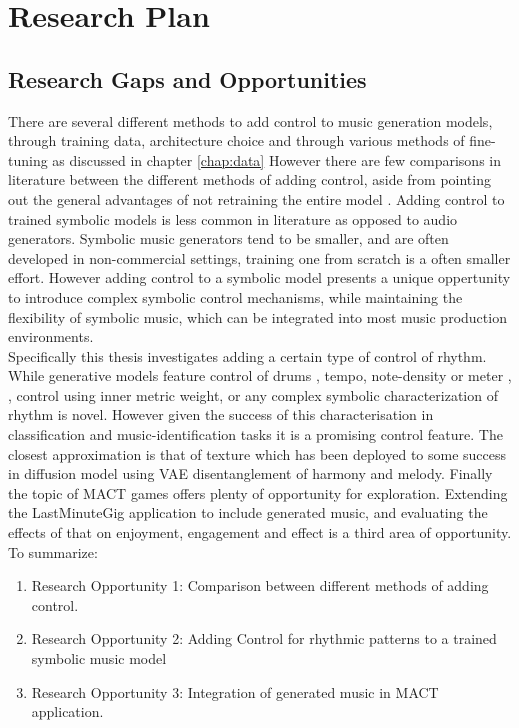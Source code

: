 

\chapter{Research Plan}
\label{chap:method}
\pagestyle{fancy}

\section{Research Gaps and Opportunities}
There are several different methods to add control to music generation models, through training data, architecture choice and through various methods of fine-tuning as discussed in chapter \ref{chap:data} However there are few comparisons in literature between the different methods of adding control, aside from pointing out the general advantages of not retraining the entire model \cite{Koo_Wichern_Germain_SMITIN_2024}\cite{Lan_Hsiao_Cheng_Yang_musicongen_2024}\cite{Lin_cocomulla_2024}. Adding control to trained symbolic models is less common in literature as opposed to audio generators. Symbolic music generators tend to be smaller, and are often developed in non-commercial settings, training one from scratch is a often smaller effort. However adding control to a symbolic model presents a unique oppertunity to introduce complex symbolic control mechanisms, while maintaining the flexibility of symbolic music, which can be integrated into most music production environments.\\
Specifically this thesis investigates adding a certain type of control of rhythm. While generative models feature control of drums \cite{Lan_Hsiao_Cheng_Yang_musicongen_2024}, tempo, note-density or meter \cite{Rütte_figaro_2023}, \cite{Huang_Yang_remi_pop_transformer_2020}, control using inner metric weight, or any complex symbolic characterization of rhythm is novel. However given the success of this characterisation in classification and music-identification tasks it is a promising control feature. The closest approximation is that of texture \cite{Min_Jiang_Xia_Zhao_polyffusion_2023} which has been deployed to some success in diffusion model using VAE disentanglement of harmony and melody. Finally the topic of MACT games offers plenty of opportunity for exploration. Extending the LastMinuteGig\cite{Chalkiadakis_2022} application to include generated music, and evaluating the effects of that on enjoyment, engagement and effect is a third area of opportunity. To summarize:
\begin{enumerate}

\item{Research Opportunity 1}: Comparison between different methods of adding control.

\item{Research Opportunity 2}: Adding Control for rhythmic patterns to a trained symbolic music model

\item {Research Opportunity 3}: Integration of generated music in MACT application. 
\end{enumerate}

